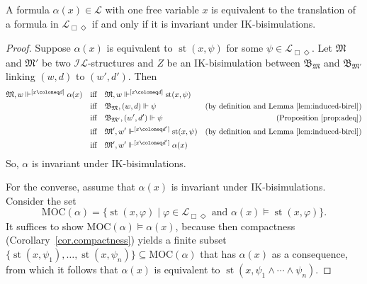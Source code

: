 \documentclass[submission,copyright,creativecommons]{eptcs}
\newcommand{\mo}{\mathfrak}
\newcommand{\B}{\mo{B}}
\newcommand{\Z}{Z}
\renewcommand{\phi}{\varphi}
\renewcommand{\iff}{\quad\text{iff}\quad}
\DeclareMathOperator{\st}{st}
\newcommand{\IL}{\mathscr{I\!\!L}}   %
\newcommand{\LL}{\mathcal{L}}        %
\newcommand{\ML}{\mathcal{L}_{\Box\Diamond}}        %
\newcommand{\MOC}{\mathrm{MOC}}
\newcommand{\satisfySym}{\Vdash}
\newcommand{\satisfy}[4]{#1, #2 \satisfySym^{#4} #3}
\newcommand{\msatisfy}[3]{#1, #2 \Vdash #3}
\begin{document}
\begin{theorem}
  A formula $\alpha(x) \in \LL$ with one free variable $x$ is equivalent to
  the translation of a formula in $\ML$ if and only if it is invariant under
  IK-bi\-si\-mu\-la\-tions.
\end{theorem}
\begin{proof}
  Suppose $\alpha(x)$ is equivalent to $\st(x,\psi)$ for some $\psi \in \ML$.
  Let $\mo{M}$ and $\mo{M}'$ be two $\IL$-structures and
  $\Z$ be an IK-bi\-si\-mu\-la\-tion between $\B_{\mo{M}}$ and $\B_{\mo{M}'}$ linking
  $(w, d)$ to $(w', d')$. Then
  \begin{align*}
    \satisfy{\mo{M}}{w}{\alpha(x)}{[x \coloneq d]}
      &\iff \satisfy{\mo{M}}{w}{\st(x,\psi)}{[x \coloneq d]} \\ 
      &\iff \msatisfy{\B_{\mo{M}}}{(w,d)}{\psi}
      &\text{(by definition and Lemma~\ref{lem:induced-birel})} \\
      &\iff \msatisfy{\B_{\mo{M'}}}{(w',d')}{\psi}
      &\text{(Proposition~\ref{prop:adeq})} \\
      &\iff \satisfy{\mo{M}'}{w'}{\st(x,\psi)}{[x \coloneq d']} 
      &\text{(by definition and Lemma~\ref{lem:induced-birel})} \\
      &\iff  \satisfy{\mo{M}'}{w'}{\alpha(x)}{[x \coloneq d']}
  \end{align*}
  So, $\alpha$ is invariant under IK-bi\-si\-mu\-la\-tions.

  For the converse, assume that $\alpha(x)$ is invariant under IK-bi\-si\-mu\-la\-tions.
  Consider the set
  \begin{equation*}
    \MOC(\alpha) = \{ \st(x,\phi) \mid \phi \in \ML
                     \text{ and } \alpha(x) \models \st(x, \phi) \}.
  \end{equation*}
  It suffices to show $\MOC(\alpha) \models \alpha(x)$, because then
  compactness (Corollary~\ref{cor.compactness}) yields a finite
  subset $\{ \st(x, \psi_1), \ldots, \st(x, \psi_n) \} \subseteq \MOC(\alpha)$
  that has $\alpha(x)$ as a consequence, from which it follows that $\alpha(x)$ is
  equivalent to $\st(x, \psi_1 \wedge \cdots \wedge \psi_n)$.
  

\end{proof}
\end{document}
